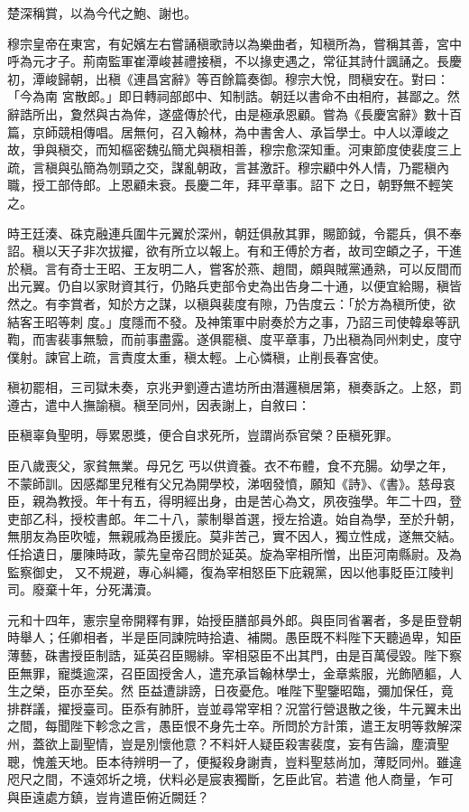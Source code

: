 \begin{pinyinscope}
 楚深稱賞，以為今代之鮑、謝也。



 穆宗皇帝在東宮，有妃嬪左右嘗誦稹歌詩以為樂曲者，知稹所為，嘗稱其善，宮中呼為元才子。荊南監軍崔潭峻甚禮接稹，不以掾吏遇之，常征其詩什諷誦之。長慶初，潭峻歸朝，出稹《連昌宮辭》等百餘篇奏御。穆宗大悅，問稹安在。對曰：「今為南
 宮散郎。」即日轉祠部郎中、知制誥。朝廷以書命不由相府，甚鄙之。然辭誥所出，夐然與古為侔，遂盛傳於代，由是極承恩顧。嘗為《長慶宮辭》數十百篇，京師競相傳唱。居無何，召入翰林，為中書舍人、承旨學士。中人以潭峻之故，爭與稹交，而知樞密魏弘簡尤與稹相善，穆宗愈深知重。河東節度使裴度三上疏，言稹與弘簡為刎頸之交，謀亂朝政，言甚激訐。穆宗顧中外人情，乃罷稹內職，授工部侍郎。上恩顧未衰。長慶二年，拜平章事。詔下
 之日，朝野無不輕笑之。



 時王廷湊、硃克融連兵圍牛元翼於深州，朝廷俱赦其罪，賜節鉞，令罷兵，俱不奉詔。稹以天子非次拔擢，欲有所立以報上。有和王傅於方者，故司空頔之子，干進於稹。言有奇士王昭、王友明二人，嘗客於燕、趙間，頗與賊黨通熟，可以反間而出元翼。仍自以家財資其行，仍賂兵吏部令史為出告身二十通，以便宜給賜，稹皆然之。有李賞者，知於方之謀，以稹與裴度有隙，乃告度云：「於方為稹所使，欲結客王昭等刺
 度。」度隱而不發。及神策軍中尉奏於方之事，乃詔三司使韓皋等訊鞫，而害裴事無驗，而前事盡露。遂俱罷稹、度平章事，乃出稹為同州刺史，度守僕射。諫官上疏，言責度太重，稹太輕。上心憐稹，止削長春宮使。



 稹初罷相，三司獄未奏，京兆尹劉遵古遣坊所由潛邏稹居第，稹奏訴之。上怒，罰遵古，遣中人撫諭稹。稹至同州，因表謝上，自敘曰：



 臣稹辜負聖明，辱累恩獎，便合自求死所，豈謂尚忝官榮？臣稹死罪。



 臣八歲喪父，家貧無業。母兄乞
 丐以供資養。衣不布體，食不充腸。幼學之年，不蒙師訓。因感鄰里兒稚有父兄為開學校，涕咽發憤，願知《詩》、《書》。慈母哀臣，親為教授。年十有五，得明經出身，由是苦心為文，夙夜強學。年二十四，登吏部乙科，授校書郎。年二十八，蒙制舉首選，授左拾遺。始自為學，至於升朝，無朋友為臣吹噓，無親戚為臣援庇。莫非苦己，實不因人，獨立性成，遂無交結。任拾遺日，屢陳時政，蒙先皇帝召問於延英。旋為宰相所憎，出臣河南縣尉。及為監察御史，
 又不規避，專心糾繩，復為宰相怒臣下庇親黨，因以他事貶臣江陵判司。廢棄十年，分死溝瀆。



 元和十四年，憲宗皇帝開釋有罪，始授臣膳部員外郎。與臣同省署者，多是臣登朝時舉人；任卿相者，半是臣同諫院時拾遺、補闕。愚臣既不料陛下天聽過卑，知臣薄藝，硃書授臣制誥，延英召臣賜緋。宰相惡臣不出其門，由是百萬侵毀。陛下察臣無罪，寵獎逾深，召臣固授舍人，遣充承旨翰林學士，金章紫服，光飾陋軀，人生之榮，臣亦至矣。然
 臣益遭誹謗，日夜憂危。唯陛下聖鑒昭臨，彌加保任，竟排群議，擢授臺司。臣忝有肺肝，豈並尋常宰相？況當行營退散之後，牛元翼未出之間，每聞陛下軫念之言，愚臣恨不身先士卒。所問於方計策，遣王友明等救解深州，蓋欲上副聖情，豈是別懷他意？不料奸人疑臣殺害裴度，妄有告論，塵瀆聖聰，愧羞天地。臣本待辨明一了，便擬殺身謝責，豈料聖慈尚加，薄貶同州。雖違咫尺之間，不遠郊圻之境，伏料必是宸衷獨斷，乞臣此官。若遣
 他人商量，乍可與臣遠處方鎮，豈肯遣臣俯近闕廷？




\end{pinyinscope}
